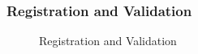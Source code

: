 \subsubsection{Registration and Validation}
\begin{figure}[!htb]
    \centering
    \caption{Registration and Validation}
    \label{fig:seq-auth-register-and-validate}
\end{figure}

